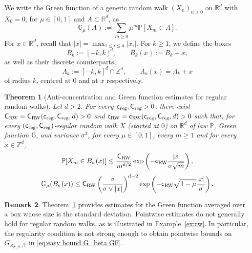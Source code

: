 \documentclass[11pt,a4paper]{article}
\numberwithin{equation}{section}
\theoremstyle{plain}
\newtheorem{Thm}{Theorem}[section]
\theoremstyle{definition}
\newtheorem{Rem}[Thm]{Remark}
\newcommand\1{\mathds{1}}
\newcommand\Crw{\mathsf{C}_{\textup{RW}}}
\newcommand\crw{\mathsf{c}_{\textup{RW}}}
\newcommand\CM{\mathsf{C}_{\textup{reg}}}
\newcommand\cM{\mathsf{c}_{\textup{reg}}}
\begin{document}
We write the Green function of a generic random walk $(X_n)_{n \ge 0}$ on $\mathbb R^d$ with $X_0=0$,
for $\mu\in [0,1]$ and $A \subset \mathbb R^d$, as
\begin{equation}
    \mathbb G_\mu(A):=\sum_{m\geq 0}\mu^m \mathbb P[X_m\in A].
\end{equation}
For $x\in \mathbb R^d$, recall that
$|x|=\max_{1\leq i \leq d}|x_i|$.
For $k\geq 1$, we define the boxes
\begin{equation}\label{eq:B-box-def}
	B_k:=[-k,k]^d, \qquad B_k(x):=B_k+x,
\end{equation}
as well as their discrete counterparts,
\begin{equation}
\label{eq:Lambda-box-def}
    \Lambda_k:=[-k,k]^d\cap \mathbb Z^d , \qquad
    \Lambda_k(x)=\Lambda_k +x
\end{equation}
of radius $k$, centred at $0$ and at $x$ respectively.

\begin{Thm}[Anti-concentration and Green function estimates for regular random walks]
\label{thm:estimate RW}
Let $d>2$.
For every $\cM,\CM>0$, there exist $\mathsf{C}_{\textup{RW}}=\Crw(\cM,\CM,d)>0$ and $\crw=\crw(\cM,\CM,d)>0$ such that, for every $(\cM,\CM)$-regular random walk $X$ (started at $0$) on $\mathbb R^d$ of law $\mathbb P$,
Green function $\mathbb G$, and variance $\sigma^2$,
for every $\mu \in [0,1]$, every $m\ge 1$
and for every $x\in \mathbb Z^d$,
\begin{equation}
\label{eq:ac-estimate}
    \mathbb P[X_m\in B_\sigma(x)]
    \leq
    \frac{\Crw}{m^{d/2}}
    \exp\left(- \crw  \frac{|x|}{\sigma \sqrt{m}}\right)
    ,
\end{equation}
	\begin{equation}
\label{eq:bound massive Green function regular walk}
		\mathbb G_\mu ( B_\sigma(x))
    \leq \Crw\left(\frac{\sigma}{\sigma\vee |x|}\right)^{d-2} \exp\left(-\crw \sqrt{1-\mu} \frac{|x|}{\sigma}\right) .
	\end{equation}
\end{Thm}
\begin{Rem}


Theorem~\ref{thm:estimate RW} provides estimates for the Green function averaged
over a box whose size is the standard deviation.
Pointwise estimates do not generally hold
for regular random walks, as is illustrated in Example~\ref{ex:rw}. In particular, the regularity condition is not strong enough to obtain pointwise bounds on $G_{Z_{\beta',\beta},\beta'}$ in \eqref{eq:easy bound G_beta GF}.
\end{Rem}
\end{document}
